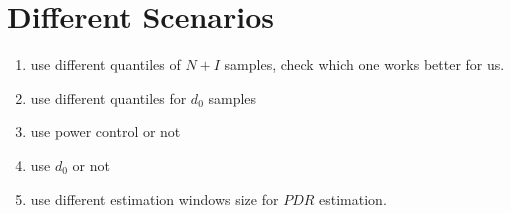 \section{Different Scenarios}
\begin{enumerate}
  \item use different quantiles of $N+I$ samples, check which one works better for us.
  \item use different quantiles for $d_0$ samples
  \item use power control or not
  \item use $d_0$ or not
  \item use different estimation windows size for $PDR$ estimation.
\end{enumerate}
